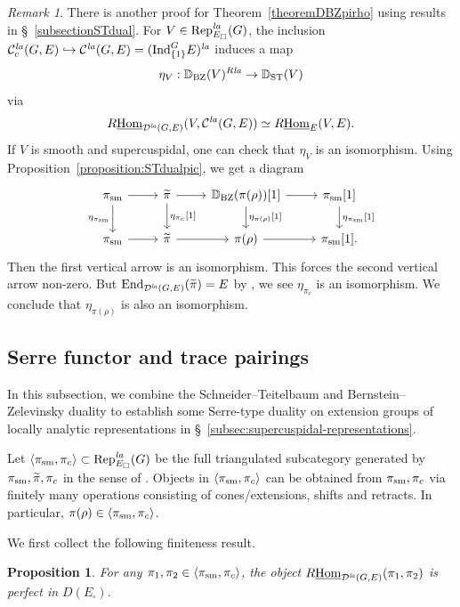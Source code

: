 \documentclass[a4paper,10pt]{amsart}
\theoremstyle{remark}
\newtheorem{remark}[theorem]{Remark}
\theoremstyle{definition}
\theoremstyle{plain}
\newtheorem{proposition}[theorem]{Proposition}
\numberwithin{equation}{section}
\newcommand{\bbD}{{\mathbb D}}
\newcommand{\calC}{{\mathcal C}}
\newcommand{\calD}{{\mathcal D}}
\newcommand{\End}{{\rm End}}
\newcommand{\Hom}{{\rm Hom}}
\newcommand{\uHom}{\underline{\Hom}}
\newcommand{\Ind}{{\rm Ind}}
\newcommand{\la}{{\it la}}
\newcommand{\Rep}{{\rm Rep}}
\newcommand{\sm}{{\rm sm}}
\newcommand{\ST}{{\rm ST}}
\newcommand{\BZ}{\ensuremath{\mathrm{BZ}}}
\begin{document}
\begin{remark}
	There is another proof for Theorem~\ref{theoremDBZpirho} using results in \S~\ref{subsectionSTdual}. For $V\in \Rep^{\la}_{E_\square}(G)$, the inclusion $\calC_c^{\la}(G,E)\hookrightarrow \calC^{\la}(G,E)=(\Ind_{\{1\}}^GE)^{\la}$ induces a map 
	\[\eta_{V}:\bbD_{\BZ}(V)^{R\la}\rightarrow \bbD_{\ST}(V)\]
	via 
	\[ R\uHom_{\calD^{\la}(G,E)}(V,\calC^{\la}(G,E))\simeq R\uHom_{E}(V,E).\]
	If $V$ is smooth and supercuspidal, one can check that $\eta_V$ is an isomorphism. Using Proposition~\ref{proposition:STdualpic}, we get a diagram
	\[\begin{tikzcd}{\pi_{\sm}} \arrow[r]\arrow[d,"{\eta_{\pi_{\sm}}}"'] & \widetilde\pi \arrow[r]\arrow[d,"{\eta_{\pi_c}[1]}"] & {\bbD_{\BZ}(\pi(\rho))[1]} \arrow[r]\arrow[d,"{\eta_{\pi(\rho)}[1]}"]
		& {\pi_{\sm}[1]}\arrow[d,"{\eta_{\pi_{\sm}}[1]}"]\\ 
		{\pi_{\sm}} \arrow[r]& \widetilde\pi
		\arrow[r] & \pi(\rho) \arrow[r]& {\pi_{\sm}[1].}
	\end{tikzcd}
	\]
	Then the first vertical arrow is an isomorphism. This forces the second vertical arrow non-zero. But $\End_{\calD^{\la}(G,E)}(\widetilde{\pi})=E$ by \cite[Prop.~2.5.2 \& Prop.~2.6.1 \& Rem.~2.5.9]{su2025locally}, we see $\eta_{\pi_c}$ is an isomorphism. We conclude that $\eta_{\pi(\rho)}$ is also an isomorphism.
\end{remark}

\subsection{Serre functor and trace pairings}
In this subsection, we combine the Schneider--Teitelbaum and Bernstein--Zelevinsky duality to establish some Serre-type duality on extension groups of locally analytic representations in \S~\ref{subsec:supercuspidal-representations}. 

Let $\langle \pi_{\sm},\pi_c\rangle\subset \Rep^{\la}_{E_\square}(G)$ be the full triangulated subcategory generated by $\pi_{\sm},\widetilde{\pi},\pi_{c}$ in the sense of \cite[\href{https://stacks.math.columbia.edu/tag/0ATG}{Tag 0ATG}]{stacks-project}. Objects in $\langle \pi_{\sm},\pi_c\rangle$ can be obtained from $\pi_{\sm},\pi_c$ via finitely many operations consisting of cones/extensions, shifts and retracts. In particular, $\pi(\rho)\in \langle \pi_{\sm},\pi_c\rangle$.

We first collect the following finiteness result.
\begin{proposition}\label{prop:four-perfectness}
For any $\pi_1,\pi_2\in \langle \pi_{\sm},\pi_c\rangle$, the object $R\uHom_{\calD^{\la}(G,E)}(\pi_1,\pi_2)$ is perfect in $D(E_\square)$.
\end{proposition}
\end{document}
